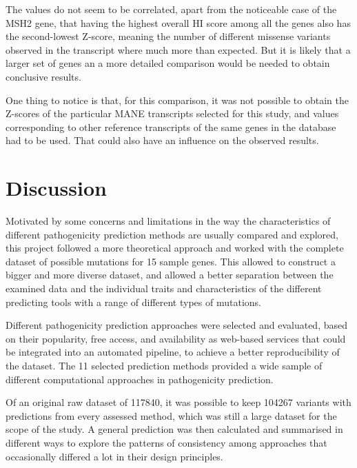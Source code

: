 \documentclass[12pt,MSc,wordcount,anon]{muthesis}
\begin{document}
\begin{flushleft}
The values do not seem to be correlated, apart from the noticeable case of the MSH2 gene, that having the highest overall HI score among all the genes also has the second-lowest Z-score, meaning the number of different missense variants observed in the transcript where much more than expected. But it is likely that a larger set of genes an a more detailed comparison would be needed to obtain conclusive results.

One thing to notice is that, for this comparison, it was not possible to obtain the Z-scores of the particular MANE transcripts selected for this study, and values corresponding to other reference transcripts of the same genes in the database had to be used. That could also have an influence on the observed results.

\section{Discussion}

Motivated by some concerns and limitations in the way the characteristics of different pathogenicity prediction methods are usually compared and explored, this project followed a more theoretical approach and worked with the complete dataset of possible mutations for 15 sample genes. This allowed to construct a bigger and more diverse dataset, and allowed a better separation between the examined data and the individual traits and characteristics of the different predicting tools with a range of different types of mutations.

Different pathogenicity prediction approaches were selected and evaluated, based on their popularity, free access, and availability as web-based services that could be integrated into an automated pipeline, to achieve a better reproducibility of the dataset. The 11 selected prediction methods provided a wide sample of different computational approaches in pathogenicity prediction.

Of an original raw dataset of 117840, it was possible to keep 104267 variants with predictions from every assessed method, which was still a large dataset for the scope of the study. A general prediction was then calculated and summarised in different ways to explore the patterns of consistency among approaches that occasionally differed a lot in their design principles.


\end{flushleft}
\end{document}

